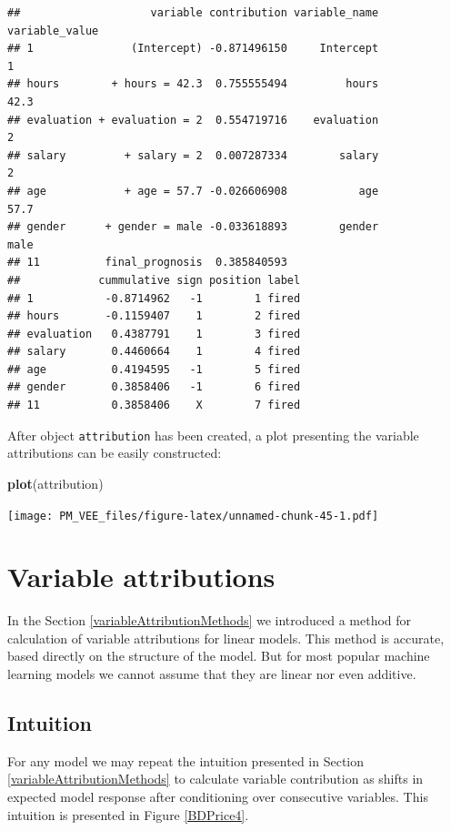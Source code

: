\documentclass[12pt,]{krantz}
\newenvironment{Shaded}{\begin{snugshade}}{\end{snugshade}}
\newcommand{\KeywordTok}[1]{\textcolor[rgb]{0.13,0.29,0.53}{\textbf{#1}}}
\newcommand{\NormalTok}[1]{#1}
\theoremstyle{definition}
\theoremstyle{definition}
\theoremstyle{definition}
\theoremstyle{remark}
\begin{document}
\begin{verbatim}
##                    variable contribution variable_name variable_value
## 1               (Intercept) -0.871496150     Intercept              1
## hours        + hours = 42.3  0.755555494         hours           42.3
## evaluation + evaluation = 2  0.554719716    evaluation              2
## salary         + salary = 2  0.007287334        salary              2
## age            + age = 57.7 -0.026606908           age           57.7
## gender      + gender = male -0.033618893        gender           male
## 11          final_prognosis  0.385840593                             
##            cummulative sign position label
## 1           -0.8714962   -1        1 fired
## hours       -0.1159407    1        2 fired
## evaluation   0.4387791    1        3 fired
## salary       0.4460664    1        4 fired
## age          0.4194595   -1        5 fired
## gender       0.3858406   -1        6 fired
## 11           0.3858406    X        7 fired
\end{verbatim}

After object \texttt{attribution} has been created, a plot presenting
the variable attributions can be easily constructed:

\begin{Shaded}
\begin{Highlighting}[]
\KeywordTok{plot}\NormalTok{(attribution)}
\end{Highlighting}
\end{Shaded}

\texttt{[image: PM\_VEE\_files/figure-latex/unnamed-chunk-45-1.pdf]}

\hypertarget{breakDown}{%
\section{Variable attributions}\label{breakDown}}

In the Section \ref{variableAttributionMethods} we introduced a method
for calculation of variable attributions for linear models. This method
is accurate, based directly on the structure of the model. But for most
popular machine learning models we cannot assume that they are linear
nor even additive.

\hypertarget{intuition-5}{%
\subsection{Intuition}\label{intuition-5}}

For any model we may repeat the intuition presented in Section
\ref{variableAttributionMethods} to calculate variable contribution as
shifts in expected model response after conditioning over consecutive
variables. This intuition is presented in Figure \ref{BDPrice4}.
\end{document}
